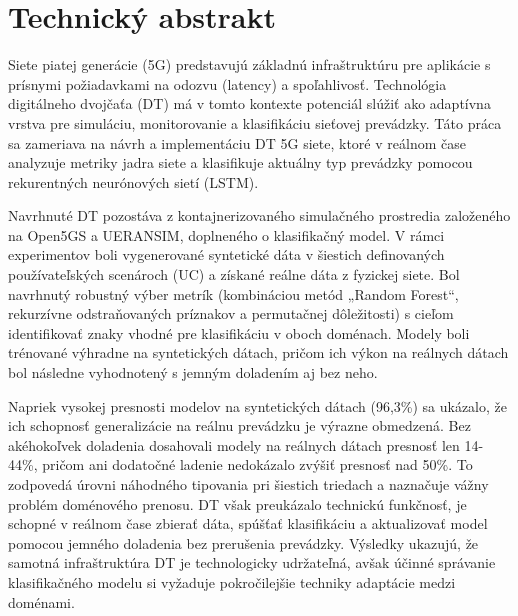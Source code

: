 \chapter{Technický abstrakt}

Siete piatej generácie (5G) predstavujú základnú infraštruktúru pre aplikácie s prísnymi požiadavkami na odozvu (latency) a spoľahlivosť. Technológia digitálneho dvojčaťa  (DT) má v tomto kontexte potenciál slúžiť ako adaptívna vrstva pre simuláciu, monitorovanie a klasifikáciu sieťovej prevádzky. Táto práca sa zameriava na návrh a implementáciu DT 5G siete, ktoré v reálnom čase analyzuje metriky jadra siete a klasifikuje aktuálny typ prevádzky pomocou rekurentných neurónových sietí (LSTM).

Navrhnuté DT pozostáva z kontajnerizovaného simulačného prostredia založeného na Open5GS a UERANSIM, doplneného o klasifikačný model. V rámci experimentov boli vygenerované syntetické dáta v šiestich definovaných používateľských scenároch (UC) a získané reálne dáta z fyzickej siete. Bol navrhnutý robustný výber metrík (kombináciou metód „Random Forest“, rekurzívne odstraňovaných príznakov a permutačnej dôležitosti) s cieľom identifikovať znaky vhodné pre klasifikáciu v oboch doménach. Modely boli trénované výhradne na syntetických dátach, pričom ich výkon na reálnych dátach bol následne vyhodnotený s jemným doladením aj bez neho.

Napriek vysokej presnosti modelov na syntetických dátach (96,3\%) sa ukázalo, že ich schopnosť generalizácie na reálnu prevádzku je výrazne obmedzená. Bez akéhokoľvek doladenia dosahovali modely na reálnych dátach presnosť len 14-44\%, pričom ani dodatočné ladenie nedokázalo zvýšiť presnosť nad 50\%. To zodpovedá úrovni náhodného tipovania pri šiestich triedach a naznačuje vážny problém doménového prenosu. DT však preukázalo technickú funkčnosť, je schopné v reálnom čase zbierať dáta, spúšťať klasifikáciu a aktualizovať model pomocou jemného doladenia bez prerušenia prevádzky. Výsledky ukazujú, že samotná infraštruktúra DT je technologicky udržateľná, avšak účinné správanie klasifikačného modelu si vyžaduje pokročilejšie techniky adaptácie medzi doménami.
